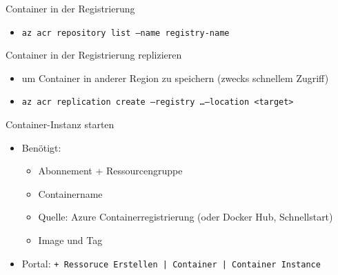 \begin{flashcard}[Definition]{Container in der Registrierung}
    \begin{itemize}
        \item \texttt{az acr repository list --name registry-name}
    \end{itemize}
\end{flashcard}

\begin{flashcard}[Definition]{Container in der Registrierung replizieren}
    \begin{itemize}
        \item um Container in anderer Region zu speichern (zwecks schnellem Zugriff)
        \item \texttt{az acr replication create --registry \ldots --location <target>}
    \end{itemize}
\end{flashcard}


\begin{flashcard}[Definition]{Container-Instanz starten}
    \begin{itemize}
        \item Benötigt:
            \begin{itemize}
                \item Abonnement + Ressourcengruppe
                \item Containername
                \item Quelle: Azure Containerregistrierung (oder Docker Hub, Schnellstart)
                \item Image und Tag
            \end{itemize}
        \item Portal: \texttt{+ Ressoruce Erstellen | Container | Container Instance}
    \end{itemize}
\end{flashcard}

